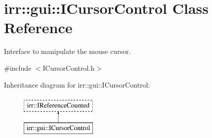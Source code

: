 \hypertarget{classirr_1_1gui_1_1ICursorControl}{}\section{irr\+:\+:gui\+:\+:I\+Cursor\+Control Class Reference}
\label{classirr_1_1gui_1_1ICursorControl}


Interface to manipulate the mouse cursor.  




{\ttfamily \#include $<$I\+Cursor\+Control.\+h$>$}

Inheritance diagram for irr\+:\+:gui\+:\+:I\+Cursor\+Control\+:\begin{figure}[H]
\begin{center}
\leavevmode
\includegraphics[height=2.000000cm]{classirr_1_1gui_1_1ICursorControl}
\end{center}
\end{figure}
